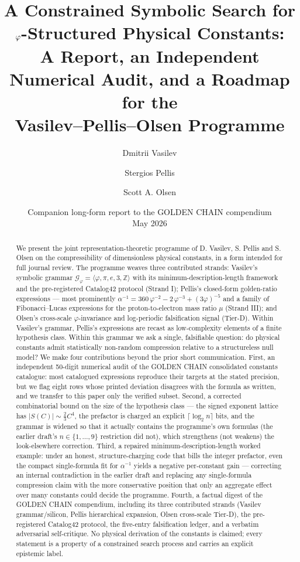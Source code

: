 \documentclass[11pt]{article}
\title{\bfseries A Constrained Symbolic Search for\\
$\phigr$-Structured Physical Constants:\\
\large A Report, an Independent Numerical Audit, and a Roadmap for the\\
Vasilev--Pellis--Olsen Programme}
\author[1]{Dmitrii Vasilev}
\author[2]{Stergios Pellis}
\author[3]{Scott A. Olsen}
\affil[1]{\footnotesize Corresponding author --- Strands I \& II (grammar $\mathcal{G}_{\phigr}$, MDL framework, Catalog42, Trinity anchor, silicon anchor) and the Bridge construction}
\affil[2]{\footnotesize University of Ioannina --- Strand III (atomic-scale $\phigr$-additive formulas for $\alpha^{-1}$ and $\mu$, Pellis Hierarchical Expansion)}
\affil[3]{\footnotesize College of Central Florida (Emeritus) --- Tier-D (cross-scale $\phigr$-invariance, log-periodic falsification signal)}
\date{Companion long-form report to the GOLDEN CHAIN compendium\\[2pt] May 2026}
\newcommand{\phigr}{\varphi}
\begin{document}
\maketitle

\begin{abstract}
We present the joint representation-theoretic programme of D. Vasilev, S. Pellis and S. Olsen on the compressibility of dimensionless physical constants, in a form intended for full journal review. The programme weaves three contributed strands: Vasilev's symbolic grammar $\mathcal{G}_{\phigr} = \langle \phigr, \pi, e, 3, \mathbb{Z} \rangle$ with its minimum-description-length framework and the pre-registered Catalog42 protocol (Strand I); Pellis's closed-form golden-ratio expressions --- most prominently $\alpha^{-1} = 360\,\phigr^{-2} - 2\,\phigr^{-3} + (3\phigr)^{-5}$ and a family of Fibonacci--Lucas expressions for the proton-to-electron mass ratio $\mu$ (Strand III); and Olsen's cross-scale $\phigr$-invariance and log-periodic falsification signal (Tier-D). Within Vasilev's grammar, Pellis's expressions are recast as low-complexity elements of a finite hypothesis class. Within this grammar we ask a single, falsifiable question: do physical constants admit statistically non-random compression relative to a structureless null model? We make four contributions beyond the prior short communication. First, an independent 50-digit numerical audit of the GOLDEN CHAIN consolidated constants catalogue: most catalogued expressions reproduce their targets at the stated precision, but we flag eight rows whose printed deviation disagrees with the formula as written, and we transfer to this paper only the verified subset. Second, a corrected combinatorial bound on the size of the hypothesis class --- the signed exponent lattice has $|S(C)| \sim \tfrac{2}{3} C^4$, the prefactor is charged an explicit $\lceil \log_2 n \rceil$ bits, and the grammar is widened so that it actually contains the programme's own formulas (the earlier draft's $n \in \{1,\dots,9\}$ restriction did not), which strengthens (not weakens) the look-elsewhere correction. Third, a repaired minimum-description-length worked example: under an honest, structure-charging code that bills the integer prefactor, even the compact single-formula fit for $\alpha^{-1}$ yields a negative per-constant gain --- correcting an internal contradiction in the earlier draft and replacing any single-formula compression claim with the more conservative position that only an aggregate effect over many constants could decide the programme. Fourth, a factual digest of the GOLDEN CHAIN compendium, including its three contributed strands (Vasilev grammar/silicon, Pellis hierarchical expansion, Olsen cross-scale Tier-D), the pre-registered Catalog42 protocol, the five-entry falsification ledger, and a verbatim adversarial self-critique. No physical derivation of the constants is claimed; every statement is a property of a constrained search process and carries an explicit epistemic label.
\end{abstract}
\end{document}
